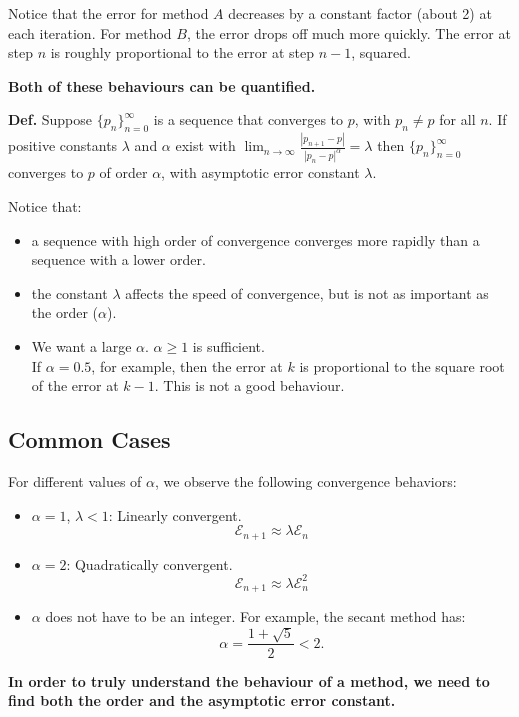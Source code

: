 \documentclass[12pt]{article}
\newcommand{\defn}{\textbf{Def.}\xspace}
\newcommand{\bigEps}{\mathcal{E}}
\begin{document}
Notice that the error for method $A$ decreases by a constant factor (about 2)
at each iteration. For method $B$, the error drops off much more quickly. The
error at step $n$ is roughly proportional to the error at step $n-1$, squared.

\textbf{Both of these behaviours can be quantified.}

\noindent\defn Suppose $\{ p_n \}_{n=0}^\infty$ is a sequence that converges to $p$,
with $p_n \neq p$ for all $n$. If positive constants $\lambda$ and $\alpha$
exist with $\displaystyle \lim_{n\to\infty} \frac{|p_{n+1}-p|}{|p_n -p|^\alpha} = \lambda$
then $\{ p_n \}_{n=0}^\infty$ converges to $p$ of order $\alpha$, with asymptotic
error constant $\lambda$.

Notice that:
\begin{itemize}
\item a sequence with high order of convergence converges more rapidly than a
  sequence with a lower order.
\item the constant $\lambda$ affects the speed of convergence, but is not as
  important as the order ($\alpha$).
\item We want a large $\alpha$. $\alpha \geq 1$ is sufficient. \\
  If $\alpha = 0.5$, for example, then the error at $k$ is proportional
  to the square root of the error at $k-1$. This is not a good behaviour.
\end{itemize}

\subsection{Common Cases}

For different values of $\alpha$, we observe the following convergence behaviors:

\begin{itemize}
    \item $\alpha = 1$, $\lambda < 1$: Linearly convergent.
    \[ \bigEps_{n+1} \approx \lambda \bigEps_n \]
    
    \item $\alpha = 2$: Quadratically convergent.
    \[ \bigEps_{n+1} \approx \lambda \bigEps_n^2 \]
    
    \item $\alpha$ does not have to be an integer. For example, the secant method has:
    \[ \alpha = \frac{1+\sqrt{5}}{2} < 2. \]
\end{itemize}

\textbf{In order to truly understand the behaviour of a method, we need to
  find both the order and the asymptotic error constant.}
\end{document}
